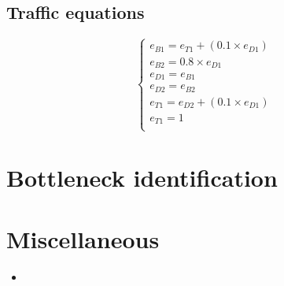 \documentclass[a4paper,12pt]{article}
\begin{document}
\subsection{Traffic equations}

\[
\begin{cases}
e_{B1} = e_{T1} + (0.1 \times e_{D1}) \\
e_{B2} = 0.8 \times e_{D1} \\
e_{D1} = e_{B1} \\
e_{D2} = e_{B2} \\
e_{T1} = e_{D2} + (0.1 \times e_{D1}) \\
e_{T1} = 1 \\
\end{cases}
\]

\section{Bottleneck identification}

\section{Miscellaneous}

\begin{itemize}
	\item 
\end{itemize}
\end{document}
